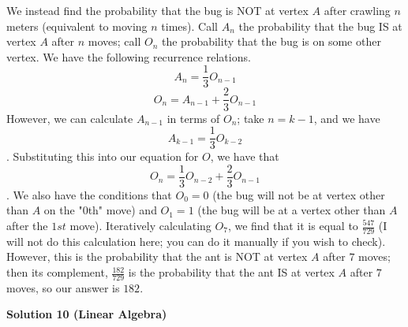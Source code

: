 \begin{enumerate}
We instead find the probability that the bug is NOT at vertex $A$ after crawling $n$ meters (equivalent to moving $n$ times). Call $A_n$ the probability that the bug IS at vertex $A$ after $n$ moves; call $O_n$ the probability that the bug is on some other vertex. We have the following recurrence relations. 
 \[A_n = \frac{1}{3}O_{n-1}\] 
 \[O_n = A_{n-1} + \frac{2}{3}O_{n-1}\] However, we can calculate $A_{n-1}$ in terms of $O_n$; take $n = k-1$, and we have 
 \[A_{k-1} = \frac{1}{3}O_{k-2}\]. Substituting this into our equation for $O$, we have that 
 \[O_n = \frac{1}{3}O_{n-2} + \frac{2}{3}O_{n-1}\]. We also have the conditions that $O_0 = 0$ (the bug will not be at vertex other than $A$ on the "0th" move) and $O_1 = 1$ (the bug will be at a vertex other than $A$ after the $1st$ move). Iteratively calculating $O_7$, we find that it is equal to $\frac{547}{729}$ (I will not do this calculation here; you can do it manually if you wish to check). However, this is the probability that the ant is NOT at vertex $A$ after $7$ moves; then its complement, $\frac{182}{729}$ is the probability that the ant IS at vertex $A$ after $7$ moves, so our answer is $\boxed{182}$.

 



\textbf{Solution 10 (Linear Algebra)}


\end{enumerate}
